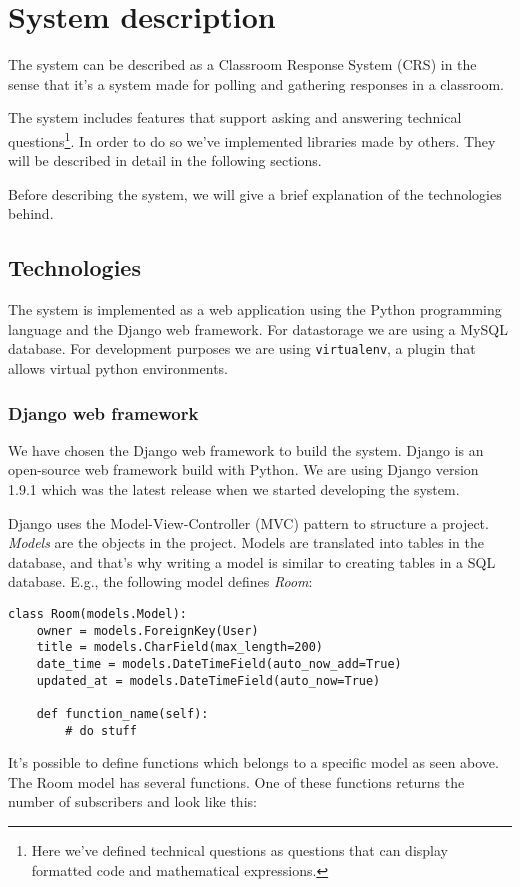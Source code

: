\section{System description}
The system can be described as a Classroom Response System (CRS) in the sense that it's a system made for polling and gathering responses in a classroom.

The system includes features that support asking and answering technical questions\footnote{Here we've defined technical questions as questions that can display formatted code and mathematical expressions.}. In order to do so we've implemented libraries made by others. They will be described in detail in the following sections.

Before describing the system, we will give a brief explanation of the technologies behind.

\subsection{Technologies}

The system is implemented as a web application using the Python programming language and the Django web framework. For datastorage we are using a MySQL database.
For development purposes we are using \texttt{virtualenv}, a plugin that allows virtual python environments.

\subsubsection{Django web framework}
We have chosen the Django web framework to build the system. Django is an open-source web framework build with Python. We are using Django version 1.9.1 which was the latest release when we started developing the system.

Django uses the Model-View-Controller (MVC) pattern to structure a project. \emph{Models} are the objects in the project. Models are translated into tables in the database, and that's why writing a model is similar to creating tables in a SQL database. E.g., the following model defines \emph{Room}: 
\begin{verbatim}
class Room(models.Model):
    owner = models.ForeignKey(User)
    title = models.CharField(max_length=200)
    date_time = models.DateTimeField(auto_now_add=True)
    updated_at = models.DateTimeField(auto_now=True)
    
    def function_name(self):
        # do stuff
\end{verbatim}
It's possible to define functions which belongs to a specific model as seen above. The Room model has several functions. One of these functions returns the number of subscribers and look like this:

